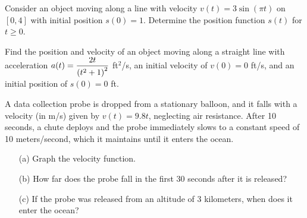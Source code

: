 \documentclass[12pt]{article}
\begin{document}
\newpage

\Example Consider an object moving along a line with velocity $v(t)=3\sin\left(\pi t\right)$ on $[0,4]$ with initial position $s(0)=1$. Determine the position function $s(t)$ for $t\geq 0$.

\newpage

\Example Find the position and velocity of an object moving along a straight line with acceleration $a(t)=\displaystyle\frac{2t}{\left( t^2+1\right)^2}$ ft$^2$/s, an initial velocity of $v(0)=0$ ft/s, and an initial position of $s(0)=0$ ft.

\newpage

\Example A data collection probe is dropped from a stationary balloon, and it falls with a velocity (in m/s) given by $v(t)=9.8t$, neglecting air resistance. After 10 seconds, a chute deploys and the probe immediately slows to a constant speed of 10 meters/second, which it maintains until it enters the ocean.

\begin{enumerate}
\item[(a)] Graph the velocity function.

\vspace{50mm}

\item[(b)] How far does the probe fall in the first 30 seconds after it is released?

\vspace{50mm}

\item[(c)] If the probe was released from an altitude of 3 kilometers, when does it enter the ocean?
\end{enumerate}
\end{document}
